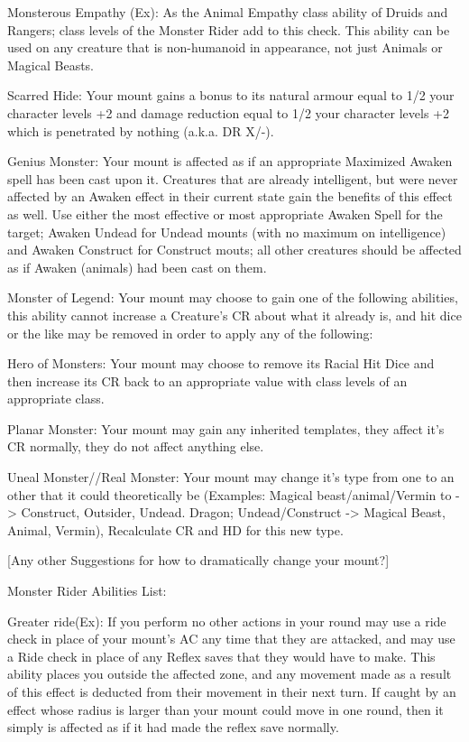Monsterous Empathy (Ex): As the Animal Empathy class ability of Druids and Rangers; class levels of the Monster Rider add to this check. This ability can be used on any creature that is non-humanoid in appearance, not just Animals or Magical Beasts.

Scarred Hide: Your mount gains a bonus to its natural armour equal to 1/2 your character levels +2 and damage reduction equal to 1/2 your character levels +2 which is penetrated by nothing (a.k.a. DR X/-).

Genius Monster: Your mount is affected as if an appropriate Maximized Awaken spell has been cast upon it. Creatures that are already intelligent, but were never affected by an Awaken effect in their current state gain the benefits of this effect as well. Use either the most effective or most appropriate Awaken Spell for the target; Awaken Undead for Undead mounts (with no maximum on intelligence) and Awaken Construct for Construct mouts; all other creatures should be affected as if Awaken (animals) had been cast on them.

Monster of Legend: Your mount may choose to gain one of the following abilities, this ability cannot increase a Creature's CR about what it already is, and hit dice or the like may be removed in order to apply any of the following:

Hero of Monsters: Your mount may choose to remove its Racial Hit Dice and then increase its CR back to an appropriate value with class levels of an appropriate class.

Planar Monster: Your mount may gain any inherited templates, they affect it's CR normally, they do not affect anything else.

Uneal Monster//Real Monster: Your mount may change it's type from one to an other that it could theoretically be (Examples: Magical beast/animal/Vermin to -> Construct, Outsider, Undead. Dragon; Undead/Construct -> Magical Beast, Animal, Vermin), Recalculate CR and HD for this new type.

[Any other Suggestions for how to dramatically change your mount?]


Monster Rider Abilities List:

Greater ride(Ex): If you perform no other actions in your round may use a ride check in place of your mount's AC any time that they are attacked, and may use a Ride check in place of any Reflex saves that they would have to make. This ability places you outside the affected zone, and any movement made as a result of this effect is deducted from their movement in their next turn. If caught by an effect whose radius is larger than your mount could move in one round, then it simply is affected as if it had made the reflex save normally.

